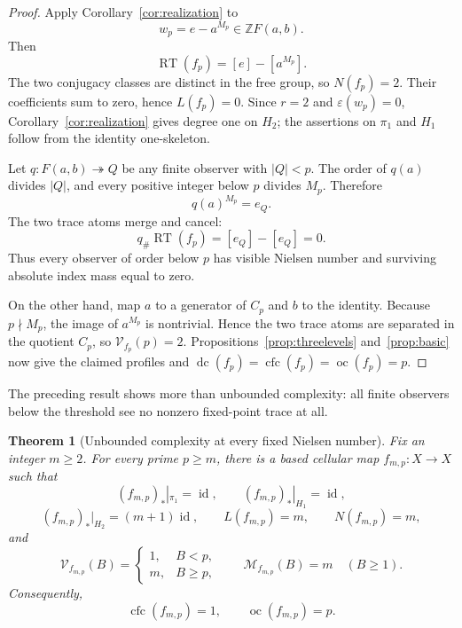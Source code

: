 \documentclass[11pt]{article}
\newtheorem{theorem}{Theorem}[section]
\DeclareMathOperator{\oc}{oc}
\DeclareMathOperator{\dc}{dc}
\DeclareMathOperator{\cfc}{cfc}
\DeclareMathOperator{\id}{id}
\newcommand{\RT}{\operatorname{RT}}
\newcommand{\VN}{\mathcal V}
\newcommand{\MN}{\mathcal M}
\newcommand{\Z}{\mathbb Z}
\begin{document}
\begin{proof}
Apply Corollary~\ref{cor:realization} to
\[
  w_p=e-a^{M_p}\in\Z F(a,b).
\]
Then
\[
  \RT(f_p)=[e]-[a^{M_p}].
\]
The two conjugacy classes are distinct in the free group, so $N(f_p)=2$.
Their coefficients sum to zero, hence $L(f_p)=0$.  Since $r=2$ and
$\varepsilon(w_p)=0$, Corollary~\ref{cor:realization} gives degree one on $H_2$;
the assertions on $\pi_1$ and $H_1$ follow from the identity one-skeleton.

Let $q\colon F(a,b)\twoheadrightarrow Q$ be any finite observer with
$|Q|<p$.  The order of $q(a)$ divides $|Q|$, and every positive integer below
$p$ divides $M_p$.  Therefore
\[
  q(a)^{M_p}=e_Q.
\]
The two trace atoms merge and cancel:
\[
  q_\#\RT(f_p)=[e_Q]-[e_Q]=0.
\]
Thus every observer of order below $p$ has visible Nielsen number and
surviving absolute index mass equal to zero.

On the other hand, map $a$ to a generator of $C_p$ and $b$ to the identity.
Because $p\nmid M_p$, the image of $a^{M_p}$ is nontrivial.  Hence the two
trace atoms are separated in the quotient $C_p$, so $\VN_{f_p}(p)=2$.
Propositions~\ref{prop:threelevels} and~\ref{prop:basic} now give the claimed profiles and
$\dc(f_p)=\cfc(f_p)=\oc(f_p)=p$.
\end{proof}

The preceding result shows more than unbounded complexity: all finite
observers below the threshold see no nonzero fixed-point trace at all.

\begin{theorem}[Unbounded complexity at every fixed Nielsen number]
\label{thm:fixedm}
Fix an integer $m\ge2$.  For every prime $p\ge m$, there is a based cellular
map $f_{m,p}\colon X\to X$ such that
\[
  (f_{m,p})_*|_{\pi_1}=\id,
  \qquad
  (f_{m,p})_*|_{H_1}=\id,
\]
\[
  (f_{m,p})_*|_{H_2}=(m+1)\id,
  \qquad
  L(f_{m,p})=m,
  \qquad
  N(f_{m,p})=m,
\]
and
\[
  \VN_{f_{m,p}}(B)=
  \begin{cases}
  1,&B<p,\\[1mm]
  m,&B\ge p,
  \end{cases}
  \qquad
  \MN_{f_{m,p}}(B)=m
  \quad(B\ge1).
\]
Consequently,
\[
  \cfc(f_{m,p})=1,
  \qquad
  \oc(f_{m,p})=p.
\]
\end{theorem}
\end{document}
